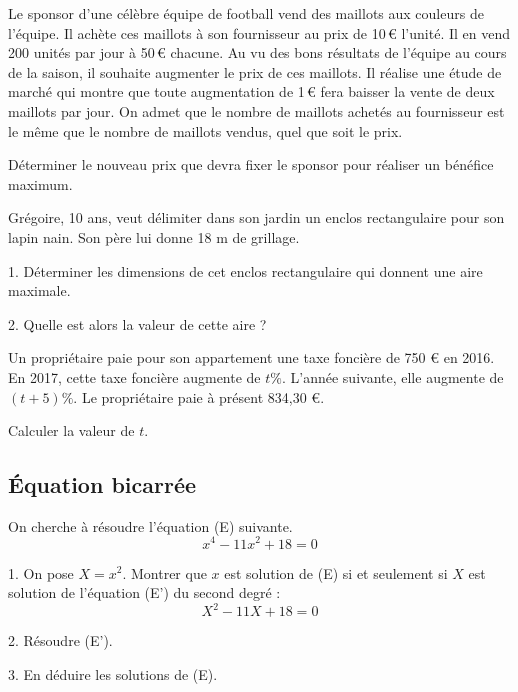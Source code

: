 \documentclass[11pt]{article}
\begin{document}
\begin{exercice}
Le sponsor d'une célèbre équipe de football vend des maillots aux couleurs de l'équipe. Il achète ces maillots à son fournisseur au prix de 10\,€ l'unité. Il en vend 200 unités par jour à 50\,€ chacune. Au vu des bons résultats de l'équipe au cours de la saison, il souhaite augmenter le prix de ces maillots. Il réalise une étude de marché qui montre que toute augmentation de 1\,€ fera baisser la vente de deux maillots par jour. On admet que le nombre de maillots achetés au fournisseur est le même que le nombre de maillots vendus, quel que soit le prix.

Déterminer le nouveau prix que devra fixer le sponsor pour réaliser un bénéfice maximum.
\end{exercice}

\begin{exercice}
Grégoire, 10 ans, veut délimiter dans son jardin un enclos rectangulaire pour son lapin nain. Son père lui donne 18 m de grillage.

1. Déterminer les dimensions de cet enclos rectangulaire qui donnent une aire maximale.

2. Quelle est alors la valeur de cette aire ?
\end{exercice}



\begin{exercice}
Un propriétaire paie pour son appartement une taxe foncière de 750 € en 2016. En 2017, cette taxe foncière augmente de $t\%$. L'année suivante, elle augmente de $(t+5)\%$. Le propriétaire paie à présent 834,30 €.

Calculer la valeur de $t$.
\end{exercice}


\begin{exercice}
\section*{Équation bicarrée}
On cherche à résoudre l'équation (E) suivante.
\[ x^4 - 11x^2 + 18 = 0 \]

1. On pose \( X = x^2 \).
Montrer que \( x \) est solution de (E) si et seulement si \( X \) est solution de l'équation (E') du second degré :
\[ X^2 - 11X + 18 = 0 \]

2. Résoudre (E').

3. En déduire les solutions de (E).
\end{exercice}
\end{document}
